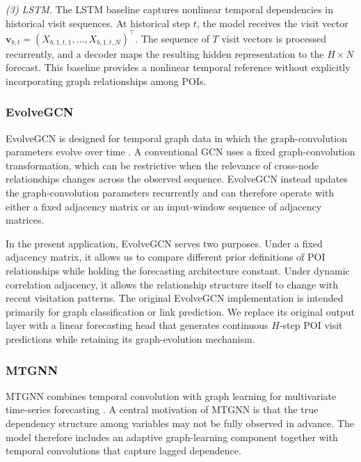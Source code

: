 \documentclass[preprint,authoryear,11pt]{elsarticle}
\def\citep#1{}%
\theoremstyle{definition}
\begin{document}
\textit{(3) LSTM.}
The LSTM baseline \citep{hochreiter1997long} captures nonlinear temporal dependencies in historical visit sequences.
At historical step \(t\), the model receives the visit vector
\(\mathbf v_{b,t}=(X_{b,1,t,1},\ldots,X_{b,1,t,N})^\top\).
The sequence of \(T\) visit vectors is processed recurrently, and a decoder maps the resulting hidden representation to the \(H\times N\) forecast.
This baseline provides a nonlinear temporal reference without explicitly incorporating graph relationships among POIs.

\subsubsection{EvolveGCN}
\label{subsubsec:evolvegcn}
EvolveGCN is designed for temporal graph data in which the graph-convolution parameters evolve over time \citep{pareja2020evolvegcn}.
A conventional GCN uses a fixed graph-convolution transformation, which can be restrictive when the relevance of cross-node relationships changes across the observed sequence.
EvolveGCN instead updates the graph-convolution parameters recurrently and can therefore operate with either a fixed adjacency matrix or an input-window sequence of adjacency matrices.

In the present application, EvolveGCN serves two purposes.
Under a fixed adjacency matrix, it allows us to compare different prior definitions of POI relationships while holding the forecasting architecture constant.
Under dynamic correlation adjacency, it allows the relationship structure itself to change with recent visitation patterns.
The original EvolveGCN implementation is intended primarily for graph classification or link prediction.
We replace its original output layer with a linear forecasting head that generates continuous \(H\)-step POI visit predictions while retaining its graph-evolution mechanism.

\subsubsection{MTGNN}
\label{subsubsec:mtgnn}

MTGNN combines temporal convolution with graph learning for multivariate time-series forecasting \citep{wu2020connecting}.
A central motivation of MTGNN is that the true dependency structure among variables may not be fully observed in advance.
The model therefore includes an adaptive graph-learning component together with temporal convolutions that capture lagged dependence.
\end{document}
